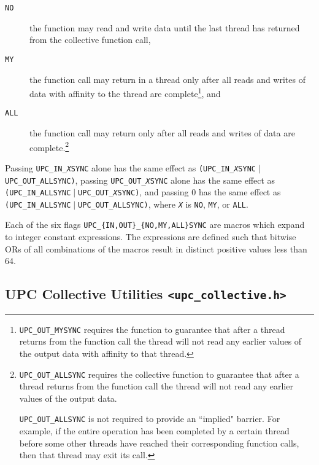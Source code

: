 \documentclass[12pt,titlepage]{article}
\newcounter{parnum}
\newcommand\np{\addtocounter{parnum}{1}\hspace{-2em}\makebox[2em][l]{\arabic{parnum}}}
\begin{document}
\begin{description}
    \item[{\tt NO}] the function may read and write data until
    the last thread has returned from the collective function call,

    \item[{\tt MY}] the function call may return in a thread
    only after all reads and writes of data with affinity to the thread
    are complete\footnote{{\tt UPC\_OUT\_MYSYNC} requires the 
  function to guarantee that after a thread returns from the
  function call the thread will not read any earlier values of the
  output data with affinity to that thread.}, and

    \item[{\tt ALL}] the function call may return only after
  all reads and writes of data are complete.\footnote{{\tt UPC\_OUT\_ALLSYNC}
  requires the collective function to guarantee that after a thread returns
  from the function call the thread will not read any earlier
  values of the output data.

  {\tt UPC\_OUT\_ALLSYNC} is not required to provide an ``implied"
  barrier.  For example, if the entire operation has been
  completed by a certain thread before some other threads have reached
  their corresponding function calls, then that thread may exit its call.}
\end{description}

\np Passing {\tt UPC\_IN\_{\em X}SYNC} alone has the same effect as
   {\tt (UPC\_IN\_{\em X}SYNC}$\;|\;${\tt UPC\_OUT\_ALLSYNC)},
   passing {\tt UPC\_OUT\_{\em X}SYNC} alone has the same effect as
   {\tt (UPC\_IN\_ALLSYNC}$\;|\;${\tt UPC\_OUT\_{\em X}SYNC)},
   and passing 0 has the same effect as
   {\tt (UPC\_IN\_ALLSYNC}$\;|\;${\tt UPC\_OUT\_ALLSYNC)},
   where {\tt {\em X}} is {\tt NO}, {\tt MY}, or {\tt ALL}.
   
\np Each of the six flags {\tt UPC\_\{IN,OUT\}\_\{NO,MY,ALL\}SYNC} are
   macros which expand to integer constant expressions.  The expressions
   are defined such that bitwise ORs of all combinations of the macros result
   in distinct positive values less than 64.

\pagebreak
\subsection{UPC Collective Utilities {\tt <upc\_collective.h>}}
\label{upc-collective}
\end{document}

